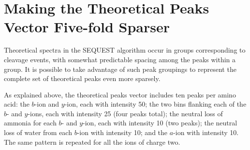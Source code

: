 \section{
  Making the Theoretical Peaks Vector Five-fold Sparser
  \label{section:fivefold}
}

Theoretical spectra in the SEQUEST algorithm occur in groups
corresponding to cleavage events, with somewhat predictable spacing
among the peaks within a group. It is possible to take advantage of
such peak groupings to represent the complete set of theoretical peaks
even more sparsely.

As explained above, the theoretical peaks vector includes ten peaks
per amino acid: the $b$-ion and $y$-ion, each with intensity 50; the
two bins flanking each of the $b$- and $y$-ions, each with intensity
25 (four peaks total); the neutral loss of ammonia for each $b$- and
$y$-ion, each with intensity 10 (two peaks); the neutral loss of water
from each $b$-ion with intensity 10; and the $a$-ion with intensity
10. The same pattern is repeated for all the ions of charge two.

